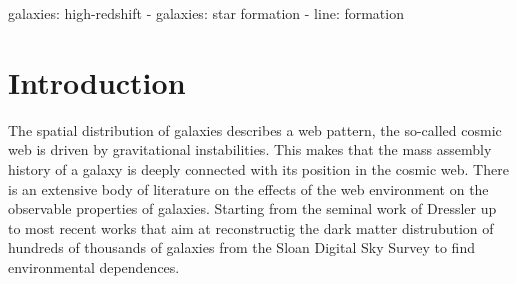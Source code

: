 \documentclass[usenatbib]{mn2e}
\begin{document}
\title[]{}
\author[]{
\parbox[t]{\textwidth}{\raggedright 
}
\vspace*{6pt}
}
\maketitle

\begin{abstract}

\end{abstract}

\begin{keywords}
galaxies: high-redshift - galaxies: star formation - line: formation
\end{keywords}



\section{Introduction}
\label{sec:introduction}

The spatial distribution of galaxies describes a web pattern, the so-called cosmic web is driven by 
gravitational instabilities. This makes that the mass assembly history of a galaxy is deeply connected 
with its position in the cosmic web. There is an extensive body of literature on the effects of the web
environment on the observable properties of galaxies. Starting from the seminal work of Dressler up to
most recent works that aim at reconstructig the dark matter distrubution of hundreds of thousands of
galaxies from the Sloan Digital Sky Survey to find environmental dependences. 
\end{document}
